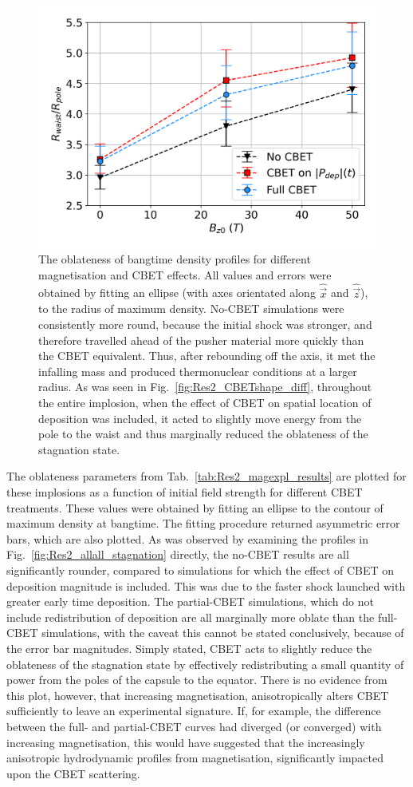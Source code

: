 \begin{figure}[t!]
    \includegraphics[width=0.6\linewidth]{Results2/Images/R2R0_errors.png}
    \centering
    \caption{The oblateness of bangtime density profiles for different magnetisation and \ac{CBET} effects.
    All values and errors were obtained by fitting an ellipse (with axes orientated along $\hat{\vec{x}}$ and $\hat{\vec{z}}$), to the radius of maximum density.
    No-\ac{CBET} simulations were consistently more round, because the initial shock was stronger, and therefore travelled ahead of the pusher material more quickly than the \ac{CBET} equivalent.
    Thus, after rebounding off the axis, it met the infalling mass and produced thermonuclear conditions at a larger radius.
    As was seen in Fig.~\ref{fig:Res2_CBETshape_diff}, throughout the entire implosion, when the effect of \ac{CBET} on spatial location of deposition was included, it acted to slightly move energy from the pole to the waist and thus marginally reduced the oblateness of the stagnation state.}%
    \label{fig:Res2_R2R0_errors}
\end{figure}

The oblateness parameters from Tab.~\ref{tab:Res2_magexpl_results} are plotted for these implosions as a function of initial field strength for different \ac{CBET} treatments.
These values were obtained by fitting an ellipse to the contour of maximum density at bangtime.
The fitting procedure returned asymmetric error bars, which are also plotted.
As was observed by examining the profiles in Fig.~\ref{fig:Res2_allall_stagnation} directly, the no-\ac{CBET} results are all significantly rounder, compared to simulations for which the effect of \ac{CBET} on deposition magnitude is included.
This was due to the faster shock launched with greater early time deposition.
The partial-\ac{CBET} simulations, which do not include redistribution of deposition are all marginally more oblate than the full-\ac{CBET} simulations, with the caveat this cannot be stated conclusively, because of the error bar magnitudes.
Simply stated, \ac{CBET} acts to slightly reduce the oblateness of the stagnation state by effectively redistributing a small quantity of power from the poles of the capsule to the equator.
There is no evidence from this plot, however, that increasing magnetisation, anisotropically alters \ac{CBET} sufficiently to leave an experimental signature.
If, for example, the difference between the full- and partial-\ac{CBET} curves had diverged (or converged) with increasing magnetisation, this would have suggested that the increasingly anisotropic hydrodynamic profiles from magnetisation, significantly impacted upon the \ac{CBET} scattering.


